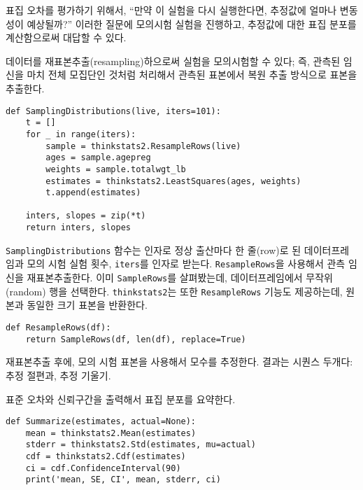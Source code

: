 표집 오차를 평가하기 위해서, ``만약 이 실험을 다시 실행한다면,
추정값에 얼마나 변동성이 예상될까?''
이러한 질문에 모의시험 실험을 진행하고, 추정값에 대한 표집 분포를 계산함으로써 대답할 수 있다.


데이터를 재표본추출(resampling)하으로써 실험을 모의시험할 수 있다; 즉, 관측된 임신을 마치 전체 모집단인 것처럼 처리해서 관측된 표본에서 복원 추출 방식으로 표본을 추출한다.

\begin{verbatim}
def SamplingDistributions(live, iters=101):
    t = []
    for _ in range(iters):
        sample = thinkstats2.ResampleRows(live)
        ages = sample.agepreg
        weights = sample.totalwgt_lb
        estimates = thinkstats2.LeastSquares(ages, weights)
        t.append(estimates)

    inters, slopes = zip(*t)
    return inters, slopes
\end{verbatim}

{\tt SamplingDistributions} 함수는 인자로 정상 출산마다 한 줄(row)로 된 데이터프레임과 모의 시험 실험 횟수, {\tt iters}를 인자로 받는다. {\tt ResampleRows}을 사용해서 관측 임신을 재표본추출한다. 이미 {\tt SampleRows}를 살펴봤는데, 데이터프레임에서 무작위(random) 행을 선택한다. {\tt thinkstats2}는 또한 {\tt ResampleRows} 기능도 제공하는데, 원본과 동일한 크기 표본을 반환한다.

\begin{verbatim}
def ResampleRows(df):
    return SampleRows(df, len(df), replace=True)
\end{verbatim}

재표본추출 후에, 모의 시험 표본을 사용해서 모수를 추정한다.
결과는 시퀀스 두개다: 추정 절편과, 추정 기울기.


표준 오차와 신뢰구간을 출력해서 표집 분포를 요약한다.

\begin{verbatim}
def Summarize(estimates, actual=None):
    mean = thinkstats2.Mean(estimates)
    stderr = thinkstats2.Std(estimates, mu=actual)
    cdf = thinkstats2.Cdf(estimates)
    ci = cdf.ConfidenceInterval(90)
    print('mean, SE, CI', mean, stderr, ci)
\end{verbatim}

